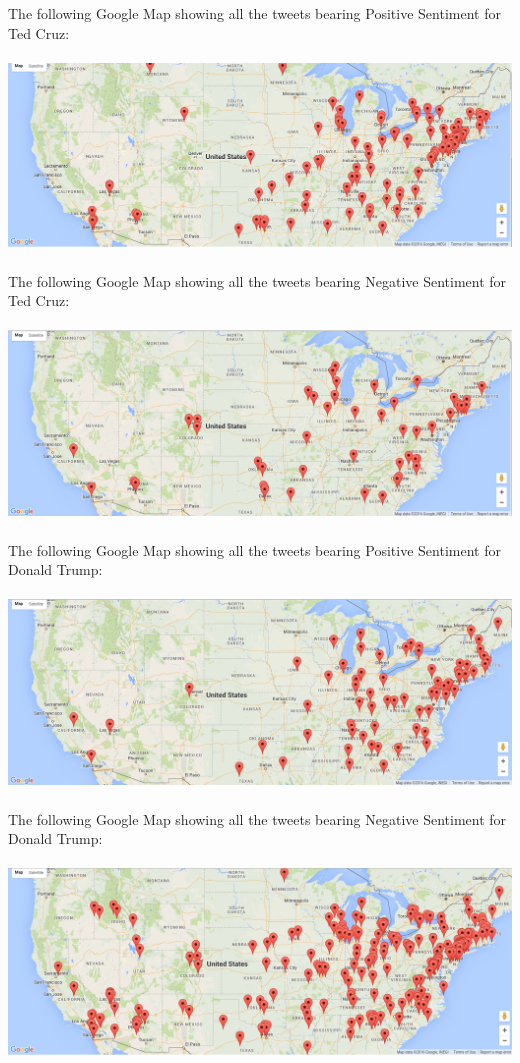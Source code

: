 \documentclass[twoside]{article}
\begin{document}
\begin{multicols}{2}
The following Google Map showing all the tweets bearing Positive Sentiment for Ted Cruz: \\ \\
\includegraphics[width=0.95\columnwidth]{cruz-pos} \\ \\
The following Google Map showing all the tweets bearing Negative Sentiment for Ted Cruz: \\ \\
\includegraphics[width=0.95\columnwidth]{cruz-neg} \\ \\
The following Google Map showing all the tweets bearing Positive Sentiment for Donald Trump: \\ \\
\includegraphics[width=0.95\columnwidth]{trump-pos} \\ \\
The following Google Map showing all the tweets bearing Negative Sentiment for Donald Trump: \\ \\
\includegraphics[width=0.95\columnwidth]{trump-neg} \\ \\


\end{multicols}
\end{document}
